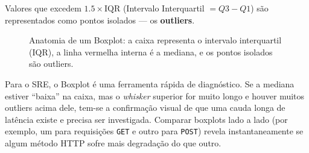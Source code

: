 \documentclass[12pt,a4paper]{report}
\begin{document}
Valores que excedem $1.5 \times \text{IQR}$ (Intervalo Interquartil $= Q3 - Q1$) são representados como pontos isolados --- os \textbf{outliers}.

\begin{figure}[h]
    \centering
    \caption{Anatomia de um Boxplot: a caixa representa o intervalo interquartil (IQR), a linha vermelha interna é a mediana, e os pontos isolados são outliers.}
\end{figure}

Para o SRE, o Boxplot é uma ferramenta rápida de diagnóstico. Se a mediana estiver ``baixa'' na caixa, mas o \textit{whisker} superior for muito longo e houver muitos outliers acima dele, tem-se a confirmação visual de que uma cauda longa de latência existe e precisa ser investigada. Comparar boxplots lado a lado (por exemplo, um para requisições \texttt{GET} e outro para \texttt{POST}) revela instantaneamente se algum método HTTP sofre mais degradação do que outro.
\end{document}
